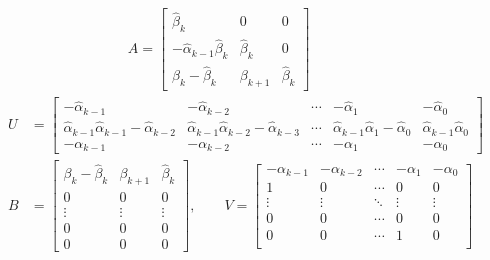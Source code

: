 \begin{subequations}
\begin{align}
& \qquad \qquad \qquad\quad A=\begin{bmatrix}
\hat{\beta}_k & 0 & 0\\
-\hat{\alpha}_{k-1}\hat{\beta}_{k} & \hat{\beta}_{k} & 0\\
\beta_k-\hat{\beta}_k & \beta_{k+1} & \hat{\beta}_k
\end{bmatrix}\\
U &= \begin{bmatrix}
-\hat{\alpha}_{k-1} &-\hat{\alpha}_{k-2} & \cdots & -\hat{\alpha}_1 & -\hat{\alpha}_0\\
\hat{\alpha}_{k-1}\hat{\alpha}_{k-1}-\hat{\alpha}_{k-2} & \hat{\alpha}_{k-1}\hat{\alpha}_{k-2}-\hat{\alpha}_{k-3} & \cdots & \hat{\alpha}_{k-1}\hat{\alpha}_1-\hat{\alpha}_0 & \hat{\alpha}_{k-1}\hat{\alpha}_0\\
-\alpha_{k-1} & -\alpha_{k-2} & \cdots & -\alpha_1 & -\alpha_0
\end{bmatrix}\\
B&=\begin{bmatrix}
\beta_k-\hat{\beta}_k & \beta_{k+1} & \hat{\beta}_k\\
0 & 0 & 0\\
\vdots & \vdots & \vdots \\
0 & 0 & 0\\
0 & 0 & 0
\end{bmatrix},\qquad V=\begin{bmatrix}
-\alpha_{k-1} & -\alpha_{k-2} & \cdots & -\alpha_1 & -\alpha_0\\
1 & 0 & \cdots & 0 & 0\\
\vdots & \vdots & \ddots & \vdots & \vdots \\
0 & 0 & \cdots & 0 & 0\\
0 & 0 & \cdots & 1 & 0\\
\end{bmatrix}
\end{align}\label{eq:ch2MEBDF}
\end{subequations}
